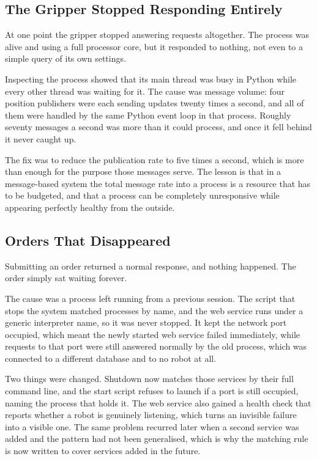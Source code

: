 \documentclass[12pt,a4paper]{report}
\begin{document}
\subsection{The Gripper Stopped Responding Entirely}
At one point the gripper stopped answering requests altogether. The process was alive and using a
full processor core, but it responded to nothing, not even to a simple query of its own settings.

Inspecting the process showed that its main thread was busy in Python while every other thread was
waiting for it. The cause was message volume: four position publishers were each sending updates
twenty times a second, and all of them were handled by the same Python event loop in that process.
Roughly seventy messages a second was more than it could process, and once it fell behind it never
caught up.

The fix was to reduce the publication rate to five times a second, which is more than enough for the
purpose those messages serve. The lesson is that in a message-based system the total message rate
into a process is a resource that has to be budgeted, and that a process can be completely
unresponsive while appearing perfectly healthy from the outside.

\subsection{Orders That Disappeared}
Submitting an order returned a normal response, and nothing happened. The order simply sat waiting
forever.

The cause was a process left running from a previous session. The script that stops the system
matched processes by name, and the web service runs under a generic interpreter name, so it was
never stopped. It kept the network port occupied, which meant the newly started web service failed
immediately, while requests to that port were still answered normally by the old process, which was
connected to a different database and to no robot at all.

Two things were changed. Shutdown now matches those services by their full command line, and
the start script refuses to launch if a port is still occupied, naming the process that holds it.
The web service also gained a health check that reports whether a robot is genuinely listening,
which turns an invisible failure into a visible one. The same problem recurred later when a second
service was added and the pattern had not been generalised, which is why the matching rule is now
written to cover services added in the future.
\end{document}
